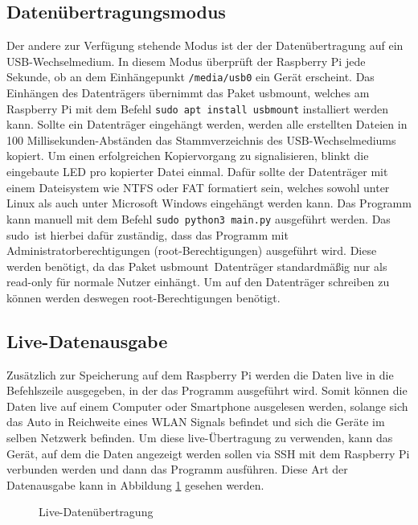 \subsection{Datenübertragungsmodus}
\label{subsec:Datenübertragungsmodus}
Der andere zur Verfügung stehende Modus ist der der Datenübertragung auf ein \ac{USB}-Wechselmedium. In diesem Modus überprüft der Raspberry Pi jede Sekunde, ob an dem Einhängepunkt \verb|/media/usb0| ein Gerät erscheint. Das Einhängen des Datenträgers übernimmt das Paket \glqq usbmount\grqq , welches am Raspberry Pi mit dem Befehl \verb|sudo apt install usbmount| installiert werden kann. Sollte ein Datenträger eingehängt werden, werden alle erstellten Dateien in 100 Millisekunden-Abständen das Stammverzeichnis des \ac{USB}-Wechselmediums kopiert. Um einen erfolgreichen Kopiervorgang zu signalisieren, blinkt die eingebaute \ac{LED} pro kopierter Datei einmal. Dafür sollte der Datenträger mit einem Dateisystem wie \ac{NTFS} oder \ac{FAT} formatiert sein, welches sowohl unter Linux als auch unter Microsoft Windows eingehängt werden kann. Das Programm kann manuell mit dem Befehl \verb|sudo python3 main.py| ausgeführt werden. Das \glqq sudo\grqq\ ist hierbei dafür zuständig, dass das Programm mit Administratorberechtigungen (root-Berechtigungen) ausgeführt wird. Diese werden benötigt, da das Paket \glqq usbmount\grqq\ Datenträger standardmäßig nur als read-only für normale Nutzer einhängt. Um auf den Datenträger schreiben zu können werden deswegen root-Berechtigungen benötigt.
\subsection{Live-Datenausgabe}
\label{subsec:LiveDatenausgabe}
Zusätzlich zur Speicherung auf dem Raspberry Pi werden die Daten live in die Befehlszeile ausgegeben, in der das Programm ausgeführt wird. Somit können die Daten live auf einem Computer oder Smartphone ausgelesen werden, solange sich das Auto in Reichweite eines \ac{WLAN} Signals befindet und sich die Geräte im selben Netzwerk befinden. Um diese live-Übertragung zu verwenden, kann das Gerät, auf dem die Daten angezeigt werden sollen via \ac{SSH} mit dem Raspberry Pi verbunden werden und dann das Programm ausführen. Diese Art der Datenausgabe kann in Abbildung \ref{fig:liveDaten} gesehen werden.
\begin{figure}[h]
\centering
\missingfigure{}
\caption{Live-Datenübertragung}
\label{fig:liveDaten}
\end{figure}